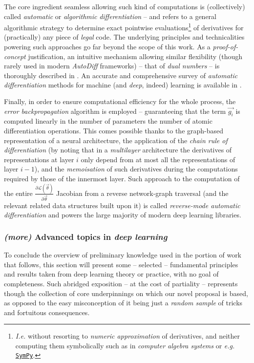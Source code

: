The core ingredient seamless allowing such kind of computations is (collectively) called \textit{automatic} or \textit{algorithmic} \textit{differentiation} -- and refers to a general algorithmic strategy to determine exact pointwise evaluations\footnote{\textit{I.e.} without resorting to \textit{numeric approximation} of derivatives, and neither computing them symbolically such as in \textit{computer algebra systems} or \textit{e.g.} \href{https://www.sympy.org/}{\texttt{SymPy}}.} of derivatives for (practically) any piece of \textit{legal} code. The underlying principles and technicalities powering such approaches go far beyond the scope of this work. As a \textit{proof-of-concept} justification, an intuitive mechanism allowing similar flexibility (though rarely used in modern \textit{AutoDiff} frameworks) -- that of \textit{dual numbers} -- is thoroughly described in \cite{Fischer1998DualNumbers}. An accurate and comprehensive survey of \textit{automatic differentiation} methods for machine (and \textit{deep}, indeed) learning is available in \cite{BaydinEtAl2018AutoDiff}.

Finally, in order to ensure computational efficiency for the whole process, the \textit{error backpropagation} algorithm is employed -- guaranteeing that the term $\vec{g_i}$ is computed linearly in the number of parameters \wrt the number of atomic differentiation operations. This comes possible thanks to the graph-based representation of a neural architecture, the application of the \textit{chain rule of differentiation} (by noting that in a \textit{multilayer} architecture the derivatives of representations at layer $i$ only depend from at most all the representations of layer $i-1$), and the \textit{memoisation} of such derivatives during the computations required by those of the innermost layer. Such approach to the computation of the entire $\frac{\partial\mathcal{L}(\vec{\theta})}{\partial\vec{\theta}}$ Jacobian from a reverse network-graph traversal (and the relevant related data structures built upon it) is called \textit{reverse-mode automatic differentiation} and powers the large majority of modern deep learning libraries.

\subsubsection{\textit{(more)} Advanced topics in \textit{deep learning}}

To conclude the overview of preliminary knowledge used in the portion of work that follows, this section will present some -- selected -- fundamental principles and results taken from deep learning theory or practice, with no goal of completeness. Such abridged exposition -- at the cost of partiality -- represents though the collection of core underpinnings on which our novel proposal is based, as opposed to the easy misconception of it being just a \textit{random sample} of tricks and fortuitous consequences.

